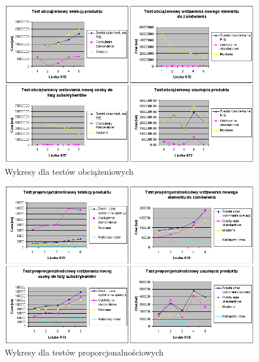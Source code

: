 \begin{figure}[p]
\begin{center}
\includegraphics[width=1.1\linewidth]{figures/chart_load.png}
\end{center}
\caption{Wykresy dla testów obciążeniowych}\label{rys:chart_load}
\end{figure}

\begin{figure}[p]
\begin{center}
\includegraphics[width=1.1\linewidth]{figures/chart_prop.png}
\end{center}
\caption{Wykresy dla testów proporcjonalnościowych}\label{rys:chart_prop}
\end{figure}


